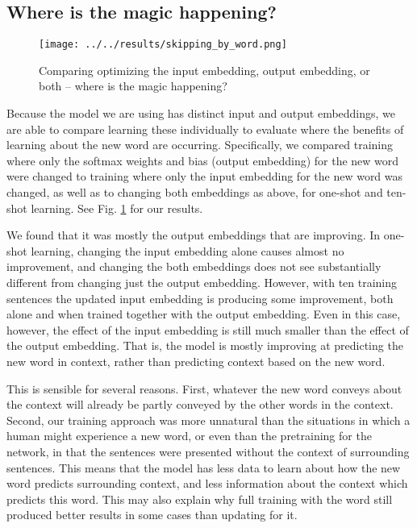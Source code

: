 \documentclass{article}
\begin{document}
\subsection{Where is the magic happening?}
\begin{figure}
\centering
\texttt{[image: ../../results/skipping\_by\_word.png]}
\caption{Comparing optimizing the input embedding, output embedding, or both -- where is the magic happening?}
\label{skipping_results}
\end{figure}
Because the model we are using has distinct input and output embeddings, we are able to compare learning these individually to evaluate where the benefits of learning about the new word are occurring. Specifically, we compared training where only the softmax weights and bias (output embedding) for the new word were changed to training where only the input embedding for the new word was changed, as well as to changing both embeddings as above, for one-shot and ten-shot learning. See Fig. \ref{skipping_results} for our results.\par
We found that it was mostly the output embeddings that are improving. In one-shot learning, changing the input embedding alone causes almost no improvement, and changing the both embeddings does not see substantially different from changing just the output embedding. However, with ten training sentences the updated input embedding is producing some improvement, both alone and when trained together with the output embedding. Even in this case, however, the effect of the input embedding is still much smaller than the effect of the output embedding. That is, the model is mostly improving at predicting the new word in context, rather than predicting context based on the new word. \par 
This is sensible for several reasons. First, whatever the new word conveys about the context will already be partly conveyed by the other words in the context. Second, our training approach was more unnatural than the situations in which a human might experience a new word, or even than the pretraining for the network, in that the sentences were presented without the context of surrounding sentences. This means that the model has less data to learn about how the new word predicts surrounding context, and less information about the context which predicts this word. This may also explain why full training with the word still produced better results in some cases than updating for it.\par
\end{document}
